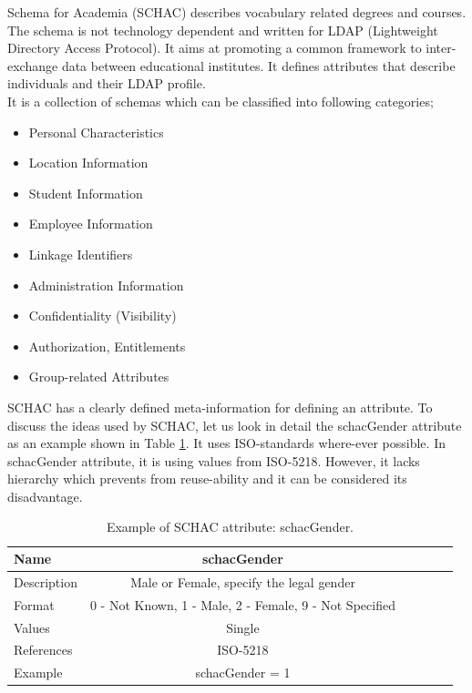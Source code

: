 \documentclass[12pt,a4paper,oneside]{book}
\begin{document}
    Schema for Academia (SCHAC) describes vocabulary related degrees and courses. The schema is not technology dependent and written for LDAP (Lightweight Directory Access Protocol). It aims at promoting a common framework to inter-exchange data between educational institutes. It defines attributes that describe individuals and their LDAP profile. \\
    
	It is a collection of schemas which can be classified into following categories;
\begin{itemize}
\item
Personal Characteristics
\item
Location Information
\item
Student Information
\item
Employee Information
\item
Linkage Identifiers
\item
Administration Information
\item
Confidentiality (Visibility)
\item
Authorization, Entitlements
\item
Group-related Attributes
\end{itemize}

	SCHAC has a clearly defined meta-information for defining an attribute. To discuss the ideas  used by SCHAC, let us look in detail the schacGender attribute as an example shown in Table \ref{tab:schacGender}. It uses ISO-standards where-ever possible. In schacGender attribute, it is using values from ISO-5218. However, it lacks hierarchy which prevents from reuse-ability and it can be considered its disadvantage.
	
\begin{table}[!tbh]
\caption{Example of SCHAC attribute: schacGender.}
\label{tab:schacGender}
\centering
\begin{tabular}[width=\columnwidth]{|p{1.3in}|c|c|c|c|c|}
\hline
Name               	& schacGender \\
\hline
Description 	    & Male or Female, specify the legal gender	\\
Format	    		& 0 - Not Known, 1 - Male, 2 - Female, 9 - Not Specified \\
Values				& Single \\
References	        & ISO-5218	\\
Example	            & schacGender = 1	\\
\hline
\end{tabular}
\end{table}
\end{document}
